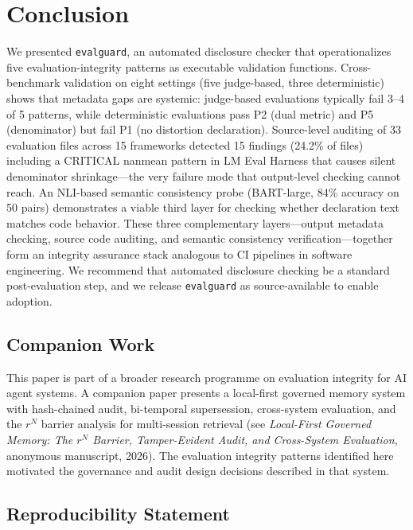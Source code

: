 \documentclass[11pt]{article}
\begin{document}
\section{Conclusion}

We presented \texttt{evalguard}, an automated disclosure checker that operationalizes five evaluation-integrity patterns as executable validation functions. Cross-benchmark validation on eight settings (five judge-based, three deterministic) shows that metadata gaps are systemic: judge-based evaluations typically fail 3--4 of 5 patterns, while deterministic evaluations pass P2 (dual metric) and P5 (denominator) but fail P1 (no distortion declaration). Source-level auditing of 33 evaluation files across 15 frameworks detected 15 findings (24.2\% of files) including a CRITICAL nanmean pattern in LM Eval Harness that causes silent denominator shrinkage---the very failure mode that output-level checking cannot reach. An NLI-based semantic consistency probe (BART-large, 84\% accuracy on 50 pairs) demonstrates a viable third layer for checking whether declaration text matches code behavior. These three complementary layers---output metadata checking, source code auditing, and semantic consistency verification---together form an integrity assurance stack analogous to CI pipelines in software engineering. We recommend that automated disclosure checking be a standard post-evaluation step, and we release \texttt{evalguard} as source-available to enable adoption.


\subsection*{Companion Work}
This paper is part of a broader research programme on evaluation integrity for AI agent systems. A companion paper presents a local-first governed memory system with hash-chained audit, bi-temporal supersession, cross-system evaluation, and the $r^N$ barrier analysis for multi-session retrieval (see \textit{Local-First Governed Memory: The $r^N$ Barrier, Tamper-Evident Audit, and Cross-System Evaluation}, anonymous manuscript, 2026). The evaluation integrity patterns identified here motivated the governance and audit design decisions described in that system.

\label{sec:repro}
\subsection*{Reproducibility Statement}
\end{document}
